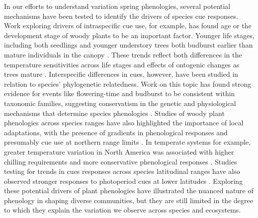 \documentclass{article}\usepackage[]{graphicx}\usepackage[]{color}
\begin{document}
In our efforts to understand variation spring phenologies, several potential mechanisms have been tested to identify the drivers of species cue responses. Work exploring drivers of intraspecific cue use, for example, has found age or the development stage of woody plants to be an important factor. Younger life stages, including both seedlings and younger understory trees both budburst earlier than mature individuals in the canopy \citep{Vitasse2013,Seiwa1991}. These trends reflect both differences in the temperature sensitivities across life stages and effects of ontogenic changes as trees mature \citep{Vitasse2013,Seiwa1991}. Interspecific differences in cues, however, have been studied in relation to species' phylogenetic relatedness. Work on this topic has found strong evidence for events like flowering-time and budburst to be consistent within taxonomic families, suggesting conservatism in the genetic and physiological mechanisms that determine species phenologies \citep{Kochmer1986,Davies2013,Gougherty2018}. Studies of woody plant phenologies across species ranges have also highlighted the importance of local adaptations, with the presence of gradients in phenological responses and presumably cue use at northern range limits \citep{Lechowicz1984,Chuine2001,Chuine2010}. In temperate systems for example, greater temperature variation in North America was associated with higher chilling requirements and more conservative phenological responses \citep{Zohner2017}.  Studies testing for trends in cues responses across species latitudinal ranges have also observed stronger responses to photoperiod cues at lower latitudes \citep{Zohner2016}. Exploring these potential drivers of plant phenologies have illustrated the nuanced nature of phenology in shaping diverse communities, but they are still limited in the degree to which they explain the variation we observe across species and ecosystems.
\end{document}
